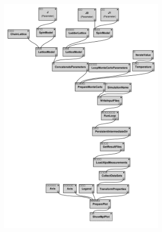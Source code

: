 \href{http://alps.comp-phys.org/vistrails/download.php?getvt=10&db=vistrails&host=alps.ethz.ch&port=3306&tag=&execute=False&showspreadsheetonly=False&embedWorkflow=True&includeFullTree=False&version=169}{\includegraphics[width=8cm]{vistrails_images/alps.ethz.ch_vistrails_3306_10_169_pdf_graph/graph_10_169.pdf}
}